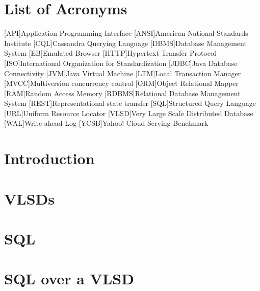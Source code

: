 \documentclass[12pt,a4paper,twoside]{book} %
\begin{document}
   \chapter*{List of Acronyms}
    \begin{acronym}[TDMA]
	  [API]{Application Programming Interface}
	  [ANSI]{American National Standards Institute}
	  [CQL]{Cassandra Querying Language}
	  [DBMS]{Database Management System}
  	  [EB]{Emulated Browser}
	  [HTTP]{Hypertext Transfer Protocol}
	  [ISO]{International Organization for Standardization}
	  [JDBC]{Java Database Connectivity}
	  [JVM]{Java Virtual Machine}
	  [LTM]{Local Transaction Manager}
	  [MVCC]{Multiversion concurrency control}
	  [ORM]{Object Relational Mapper}
	  [RAM]{Random Access Memory}
	  [RDBMS]{Relational Database Management System}
	  [REST]{Representational state transfer}
	  [SQL]{Structured Query Language}
	  [URL]{Uniform Resource Locator}
	  [VLSD]{Very Large Scale Distributed Database}
	  [WAL]{Write-ahead Log}	 
	  [YCSB]{Yahoo! Cloud Serving Benchmark}	 
	\end{acronym}
\newpage
\thispagestyle{plain}
\mbox{}
\cleardoublepage
	

	\acresetall
	
	\chapter{Introduction}
	\label{chap:intro}
        
		\mbox{}
    \chapter{VLSDs}
        
   	    \mbox{}		
    \chapter{SQL}
       
   	   \mbox{}
	\chapter{SQL over a VLSD}
	\label{chap:cass}
       
       \mbox{}
\end{document}
